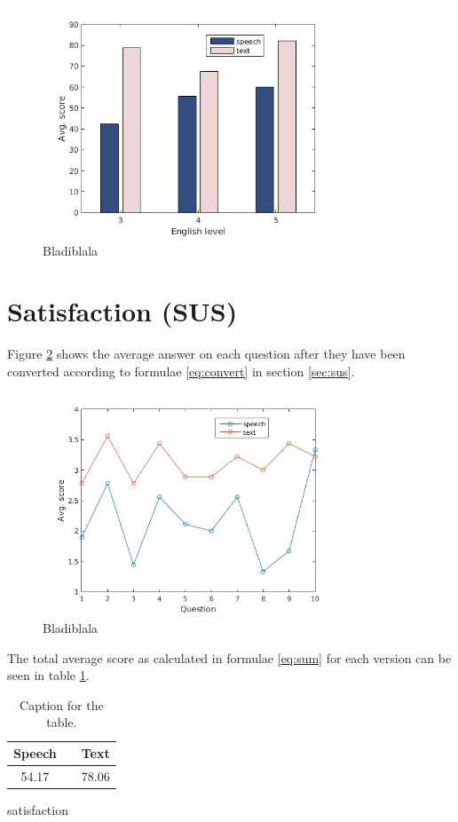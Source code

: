 \begin{figure}[p]
  \centering
  \includegraphics[width=0.8\textwidth]{images/english_score.jpg}
  \caption{Bladiblala}\label{eng_score}
\end{figure}


\section{Satisfaction (SUS)}
Figure \ref{sus_table} shows the average answer on each question after they have been converted according to formulae \ref{eq:convert} in section \ref{sec:sus}. 
\begin{figure}[p]
  \centering
  \includegraphics[width=0.8\textwidth]{images/sus.jpg}
  \caption{Bladiblala}\label{sus_table}
\end{figure}

The total average score as calculated in formulae \ref{eq:sum} for each version can be seen in table \ref{tot_score}.
\begin{table}[h!]
  \centering
  \begin{tabular}{ccc}
    \toprule
    Speech &   & Text\\
    \midrule
    54.17 &   & 78.06\\
    \bottomrule
  \end{tabular}
  \caption{Caption for the table.}\label{tot_score}
\end{table}

satisfaction